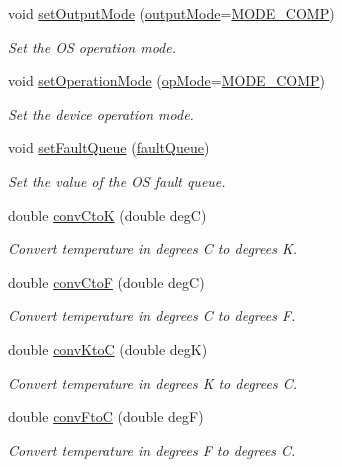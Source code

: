 \begin{DoxyCompactItemize}
void \hyperlink{class_l_m75_a39cbe2f4df2383e180e8529f62c6b060}{set\-Output\-Mode} (\hyperlink{class_l_m75_a32d79ab5e1a4b80d9a52cb9d62b590e5}{output\-Mode}=\hyperlink{class_l_m75_a32d79ab5e1a4b80d9a52cb9d62b590e5a9fadb52968bde2b7e910a9453738f0a7}{M\-O\-D\-E\-\_\-\-C\-O\-M\-P})
\begin{DoxyCompactList}\small\item\em Set the O\-S operation mode. \end{DoxyCompactList}\item 
void \hyperlink{class_l_m75_ab80973db8f5e692fde8f31ad07730bdd}{set\-Operation\-Mode} (\hyperlink{class_l_m75_a6194e0c26b8fc717dade26a62070e976}{op\-Mode}=\hyperlink{class_l_m75_a32d79ab5e1a4b80d9a52cb9d62b590e5a9fadb52968bde2b7e910a9453738f0a7}{M\-O\-D\-E\-\_\-\-C\-O\-M\-P})
\begin{DoxyCompactList}\small\item\em Set the device operation mode. \end{DoxyCompactList}\item 
void \hyperlink{class_l_m75_a7ef89d16df90b16213b06b982bbfe429}{set\-Fault\-Queue} (\hyperlink{class_l_m75_adc17def542ebe019d6ef064bdcb37f10}{fault\-Queue})
\begin{DoxyCompactList}\small\item\em Set the value of the O\-S fault queue. \end{DoxyCompactList}\item 
double \hyperlink{class_l_m75_a25d48da08bf14dc858be423aa6862e67}{conv\-Cto\-K} (double deg\-C)
\begin{DoxyCompactList}\small\item\em Convert temperature in degrees C to degrees K. \end{DoxyCompactList}\item 
double \hyperlink{class_l_m75_a074cc687ec77ca65a266c612b9411687}{conv\-Cto\-F} (double deg\-C)
\begin{DoxyCompactList}\small\item\em Convert temperature in degrees C to degrees F. \end{DoxyCompactList}\item 
double \hyperlink{class_l_m75_a01f19d9d8652641a2448021a5d09ecab}{conv\-Kto\-C} (double deg\-K)
\begin{DoxyCompactList}\small\item\em Convert temperature in degrees K to degrees C. \end{DoxyCompactList}\item 
double \hyperlink{class_l_m75_ac7c608e0e2edf521c14872e3e01ed449}{conv\-Fto\-C} (double deg\-F)
\begin{DoxyCompactList}\small\item\em Convert temperature in degrees F to degrees C. \end{DoxyCompactList}\end{DoxyCompactItemize}
